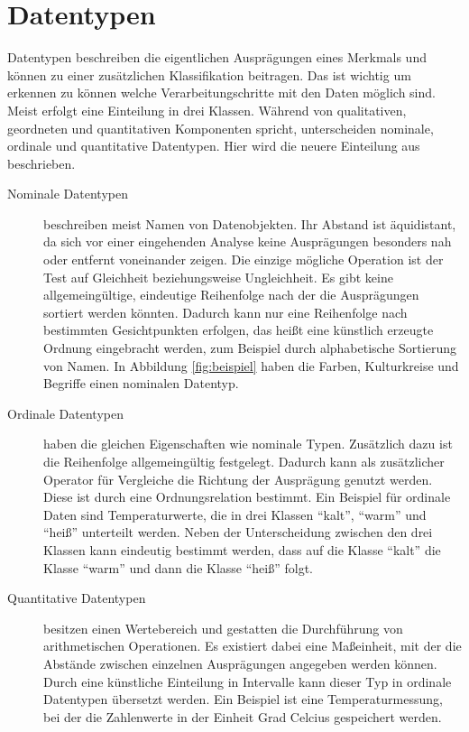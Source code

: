 \documentclass[a4paper, 
               12pt,
               DIV=calc,
               version=first,
               pdftex,
               headsepline,
               footsepline,
               bibtotocnumbered,
               liststotocnumbered]{scrreprt}
\begin{document}
\section{Datentypen}
\label{sec:Datentypen}
Datentypen beschreiben die eigentlichen Ausprägungen eines Merkmals und können zu einer zusätzlichen
Klassifikation beitragen. Das ist wichtig um erkennen zu können welche Verarbeitungschritte mit den Daten
möglich sind. Meist erfolgt eine Einteilung in drei Klassen. Während \citep{Bertin} von qualitativen,
geordneten und quantitativen Komponenten spricht, unterscheiden \citep{Preim} nominale, ordinale und
quantitative Datentypen.
Hier wird die neuere Einteilung aus \citep{Preim} beschrieben.
\begin{description}
\item[Nominale Datentypen]
beschreiben meist Namen von Datenobjekten. Ihr Abstand ist äquidistant, da sich vor einer eingehenden Analyse
keine Ausprägungen besonders nah oder entfernt voneinander zeigen. Die einzige mögliche Operation ist der Test auf
Gleichheit beziehungsweise Ungleichheit. Es gibt keine allgemeingültige, eindeutige Reihenfolge
nach der die Ausprägungen sortiert werden könnten. Dadurch kann nur eine Reihenfolge nach bestimmten Gesichtpunkten erfolgen,
das heißt eine künstlich erzeugte Ordnung eingebracht werden, zum Beispiel durch alphabetische Sortierung von Namen.
In Abbildung \ref{fig:beispiel} haben die Farben, Kulturkreise und Begriffe einen nominalen Datentyp.
\item[Ordinale Datentypen]
haben die gleichen Eigenschaften wie nominale Typen.
Zusätzlich dazu ist die Reihenfolge allgemeingültig festgelegt. Dadurch kann als zusätzlicher Operator für Vergleiche die Richtung der
Ausprägung genutzt werden. Diese ist durch eine Ordnungsrelation bestimmt. Ein Beispiel für ordinale Daten sind Temperaturwerte,
die in drei Klassen "`kalt"', "`warm"' und "`heiß"' unterteilt werden. Neben der Unterscheidung zwischen den drei
Klassen kann eindeutig bestimmt werden, dass auf die Klasse "`kalt"' die Klasse "`warm"' und dann die Klasse
"`heiß"' folgt. 
\item[Quantitative Datentypen] besitzen einen Wertebereich und gestatten die Durchführung von arithmetischen Operationen.
Es existiert dabei eine Maßeinheit, mit der die Abstände zwischen einzelnen Ausprägungen angegeben werden können. Durch eine 
künstliche Einteilung in Intervalle kann dieser Typ in ordinale Datentypen übersetzt werden.
Ein Beispiel ist eine Temperaturmessung, bei der die Zahlenwerte in der Einheit Grad Celcius gespeichert werden.
\end{description}
\end{document}
